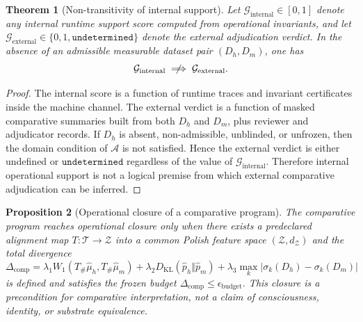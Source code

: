 \documentclass[11pt,a4paper]{article}
\newtheorem{theorem}{Theorem}[section]
\newtheorem{proposition}[theorem]{Proposition}
\begin{document}
\begin{theorem}[Non-transitivity of internal support]
Let $\mathcal{G}_{\mathrm{internal}}\in[0,1]$ denote any internal runtime support
score computed from operational invariants, and let
$\mathcal{G}_{\mathrm{external}}\in\{0,1,\mathtt{undetermined}\}$ denote the
external adjudication verdict. In the absence of an admissible measurable
dataset pair $(D_h,D_m)$, one has
\begin{equation}
\mathcal{G}_{\mathrm{internal}}\centernot\implies\mathcal{G}_{\mathrm{external}}.
\end{equation}
\end{theorem}

\begin{proof}
The internal score is a function of runtime traces and invariant certificates
inside the machine channel. The external verdict is a function of masked
comparative summaries built from both $D_h$ and $D_m$, plus reviewer and
adjudicator records. If $D_h$ is absent, non-admissible, unblinded, or
unfrozen, then the domain condition of $\mathcal{A}$ is not satisfied. Hence the
external verdict is either undefined or $\mathtt{undetermined}$ regardless of
the value of $\mathcal{G}_{\mathrm{internal}}$. Therefore internal operational
support is not a logical premise from which external comparative adjudication
can be inferred.
\end{proof}

\begin{proposition}[Operational closure of a comparative program]
The comparative program reaches operational closure only when there exists a
predeclared alignment map $T:\mathcal{T}\to\mathcal{Z}$ into a common Polish
feature space $(\mathcal{Z},d_{\mathcal{Z}})$ and the total divergence
\begin{equation}
\Delta_{\mathrm{comp}} =
  \lambda_1 W_1(T_{\#}\widehat{\mu}_h,T_{\#}\widehat{\mu}_m)
  + \lambda_2 D_{\mathrm{KL}}(\widehat{p}_h\Vert \widehat{p}_m)
  + \lambda_3 \max_k |\sigma_k(D_h)-\sigma_k(D_m)|
\end{equation}
is defined and satisfies the frozen budget
$\Delta_{\mathrm{comp}}\leq\epsilon_{\mathrm{budget}}$. This closure is a
precondition for comparative interpretation, not a claim of consciousness,
identity, or substrate equivalence.
\end{proposition}
\end{document}
